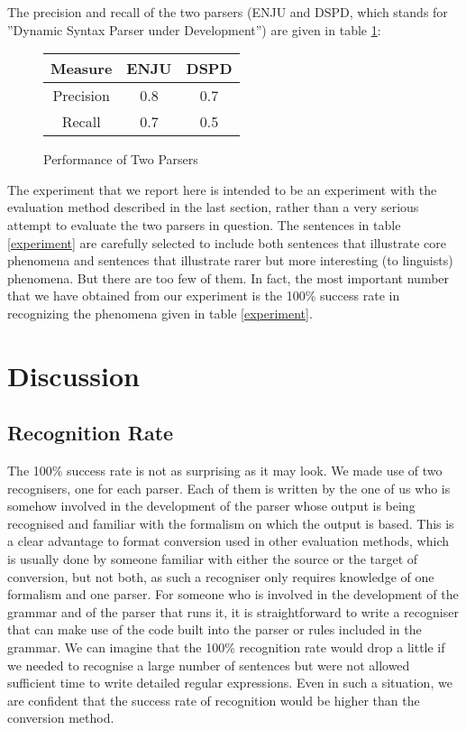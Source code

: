\documentclass[11pt]{article}
\begin{document}
The precision and recall of the two parsers (ENJU and DSPD, which stands for ''Dynamic Syntax Parser under Development'')  are given in table \ref{result}:

\begin{figure}
\begin{tabular}{| c | c  | c |}
\hline
  Measure & ENJU & DSPD \\
\hline
  Precision & 0.8 & 0.7 \\
  Recall & 0.7 & 0.5 \\ 
\hline
\end{tabular}
\caption{Performance of Two Parsers}\label{result}
\end{figure}

The experiment that we report here is intended to be an experiment with the evaluation method described in the last section, rather than a very serious attempt to evaluate the two parsers in question. The sentences in table \ref{experiment} are carefully selected to include both sentences that illustrate core phenomena and sentences that illustrate rarer but more interesting (to linguists) phenomena. But there are too few of them. In fact, the most important number that we have obtained from our experiment is the 100\% success rate in recognizing the phenomena given in table \ref{experiment}.

\section{Discussion}

\subsection{Recognition Rate}
The 100\% success rate is not as surprising as it may look. We made use of two recognisers, one for each parser. Each of them is written by the one of us who is somehow involved in the development of the parser whose output is being recognised and familiar with the formalism on which the output is based. This is a clear advantage to format conversion used in other evaluation methods, which is usually done by someone familiar with either the source or the target of conversion, but not both, as such a recogniser only requires knowledge of one formalism and one parser. For someone who is involved in the development of the grammar and of the parser that runs it, it is straightforward to write a recogniser that can make use of the code built into the parser or rules included in the grammar. We can imagine that the 100\% recognition rate would drop a little if we needed to recognise a large number of sentences but were not allowed sufficient time to write detailed regular expressions. Even in such a situation, we are confident that the success rate of recognition would be higher than the conversion method. 
\end{document}
